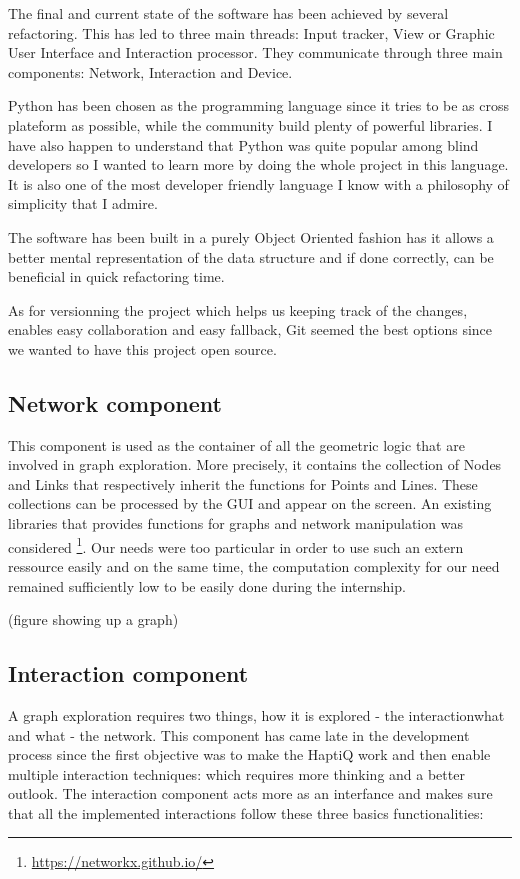 The final and current state of the software has been achieved by
several refactoring. This has led to
three main threads: Input tracker, View or Graphic User Interface and Interaction processor. They communicate through three main components: Network, Interaction and Device.

Python has been chosen as the programming language since it tries to be as cross plateform as possible, while the community build plenty of powerful libraries. I have also happen to understand that Python was quite popular among blind developers so I wanted to learn more by doing the whole project in this language. It is also one of the most developer friendly language I know with a philosophy of simplicity that I admire.

The software has been built in a purely Object Oriented fashion has it allows a better mental representation of the data structure and if done correctly, can be beneficial in quick refactoring time.

As for versionning the project which helps us keeping track of the changes, enables easy collaboration and easy fallback, Git seemed the best options since we wanted to have this project open source.

\subsection{Network component}\label{graph-component}

This component is used as the container of all the geometric logic that
are involved in graph exploration. More precisely, it contains the
collection of Nodes and Links that respectively inherit the functions
for Points and Lines. These collections can be processed by the GUI and
appear on the screen. An existing libraries that provides functions for
graphs and network manipulation was considered \footnote{\url{https://networkx.github.io/}}.
Our needs were too particular in order to use such an extern ressource
easily and on the same time, the computation complexity for our need
remained sufficiently low to be easily done during the internship.

(figure showing up a graph)

\subsection{Interaction component}\label{interaction-component}

A graph exploration requires two things, how it is explored - the interactionwhat and what - the network. This component has came late in the development process since the first objective was to make the HaptiQ work
and then enable multiple interaction techniques: which requires more
thinking and a better outlook. The interaction component acts more as an interfance and makes sure that
all the implemented interactions follow these three basics functionalities:

